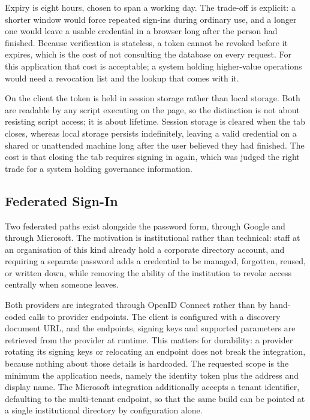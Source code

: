 Expiry is eight hours, chosen to span a working day. The trade-off is explicit: a shorter
window would force repeated sign-ins during ordinary use, and a longer one would leave a
usable credential in a browser long after the person had finished. Because verification is
stateless, a token cannot be revoked before it expires, which is the cost of not consulting
the database on every request. For this application that cost is acceptable; a system holding
higher-value operations would need a revocation list and the lookup that comes with it.

On the client the token is held in session storage rather than local storage. Both are
readable by any script executing on the page, so the distinction is not about resisting
script access; it is about lifetime. Session storage is cleared when the tab closes, whereas
local storage persists indefinitely, leaving a valid credential on a shared or unattended
machine long after the user believed they had finished. The cost is that closing the tab
requires signing in again, which was judged the right trade for a system holding governance
information.

\subsection{Federated Sign-In}

Two federated paths exist alongside the password form, through Google and through Microsoft.
The motivation is institutional rather than technical: staff at an organisation of this kind
already hold a corporate directory account, and requiring a separate password adds a
credential to be managed, forgotten, reused, or written down, while removing the ability of
the institution to revoke access centrally when someone leaves.

Both providers are integrated through OpenID Connect rather than by hand-coded calls to
provider endpoints. The client is configured with a discovery document URL, and the endpoints,
signing keys and supported parameters are retrieved from the provider at runtime. This matters
for durability: a provider rotating its signing keys or relocating an endpoint does not break
the integration, because nothing about those details is hardcoded. The requested scope is the
minimum the application needs, namely the identity token plus the address and display name.
The Microsoft integration additionally accepts a tenant identifier, defaulting to the
multi-tenant endpoint, so that the same build can be pointed at a single institutional
directory by configuration alone.

